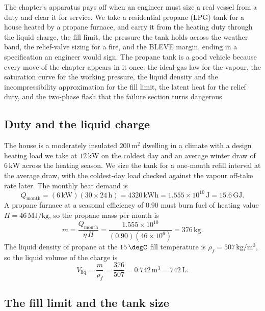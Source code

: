 The chapter's apparatus pays off when an engineer must size a real vessel
from a duty and clear it for service. We take a residential propane
(LPG) tank for a house heated by a propane furnace, and carry it from the
heating duty through the liquid charge, the fill limit, the pressure the
tank holds across the weather band, the relief-valve sizing for a fire,
and the BLEVE margin, ending in a specification an engineer would sign.
The propane tank is a good vehicle because every move of the chapter
appears in it once: the ideal-gas law for the vapour, the saturation
curve for the working pressure, the liquid density and the
incompressibility approximation for the fill limit, the latent heat for
the relief duty, and the two-phase flash that the failure section turns
dangerous.

\subsection{Duty and the liquid charge}

The house is a moderately insulated $200\,\text{m}^2$ dwelling in a
climate with a design heating load we take at $12\,\text{kW}$ on the
coldest day and an average winter draw of $6\,\text{kW}$ across the
heating season. We size the tank for a one-month refill interval at the
average draw, with the coldest-day load checked against the vapour
off-take rate later. The monthly heat demand is
\[
Q_{\text{month}} = (6\,\text{kW})(30\times 24\,\text{h}) = 4320\,
\text{kWh} = 1.555\times 10^{10}\,\text{J} = 15.6\,\text{GJ}.
\]
A propane furnace at a seasonal efficiency of $0.90$ must burn fuel of
heating value $H = 46\,\text{MJ}/\text{kg}$, so the propane mass per
month is
\[
m = \frac{Q_{\text{month}}}{\eta\, H} = \frac{1.555\times 10^{10}}
{(0.90)(46\times 10^6)} = 376\,\text{kg}.
\]
The liquid density of propane at the $15\,\degC$ fill temperature is
$\rho_f = 507\,\text{kg}/\text{m}^3$, so the liquid volume of the charge
is
\[
V_{\text{liq}} = \frac{m}{\rho_f} = \frac{376}{507} = 0.742\,\text{m}^3
= 742\,\text{L}.
\]

\subsection{The fill limit and the tank size}


